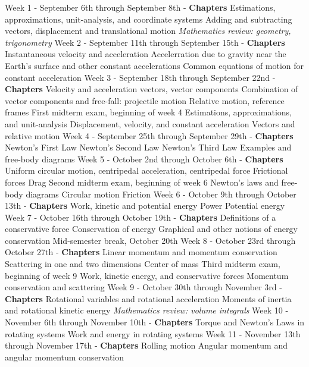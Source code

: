 \documentclass[10pt]{article}
\begin{document}
\begin{outline}[enumerate]
\1 Week 1 - September 6th through September 8th - \textbf{Chapters}
\2 Estimations, approximations, unit-analysis, and coordinate systems
\2 Adding and subtracting vectors, displacement and translational motion
\2 \textit{Mathematics review: geometry, trigonometry}
\1 Week 2 - September 11th through September 15th - \textbf{Chapters}
\2 Instantaneous velocity and acceleration
\2 Accelerration due to gravity near the Earth's surface and other constant accelerations
\2 Common equations of motion for constant acceleration	
\1 Week 3 - September 18th through September 22nd - \textbf{Chapters}
\2 Velocity and acceleration vectors, vector components
\2 Combination of vector components and free-fall: projectile motion
\2 Relative motion, reference frames
\1 First midterm exam, beginning of week 4
\2 Estimations, approximations, and unit-analysis
\2 Displacement, velocity, and constant acceleration
\2 Vectors and relative motion
\1 Week 4 - September 25th through September 29th - \textbf{Chapters}
\2 Newton's First Law
\2 Newton's Second Law
\2 Newton's Third Law
\2 Examples and free-body diagrams
\1 Week 5 - October 2nd through October 6th - \textbf{Chapters}
\2 Uniform circular motion, centripedal acceleration, centripedal force
\2 Frictional forces
\2 Drag
\clearpage
\1 Second midterm exam, beginning of week 6
\2 Newton's laws and free-body diagrams
\2 Circular motion
\2 Friction
\1 Week 6 - October 9th through October 13th - \textbf{Chapters}
\2 Work, kinetic and potential energy
\2 Power
\2 Potential energy
\1 Week 7 - October 16th through October 19th - \textbf{Chapters}
\2 Definitions of a conservative force
\2 Conservation of energy
\3 Graphical and other notions of energy conservation
\1 Mid-semester break, October 20th
\1 Week 8 - October 23rd through October 27th - \textbf{Chapters}
\2 Linear momentum and momentum conservation
\2 Scattering in one and two dimensions
\2 Center of mass
\1 Third midterm exam, beginning of week 9
\2 Work, kinetic energy, and conservative forces
\2 Momentum conservation and scattering
\1 Week 9 - October 30th through November 3rd - \textbf{Chapters}
\2 Rotational variables and rotational acceleration
\2 Moments of inertia and rotational kinetic energy
\3 \textit{Mathematics review: volume integrals}
\1 Week 10 - November 6th through November 10th - \textbf{Chapters}
\2 Torque and Newton's Laws in rotating systems
\2 Work and energy in rotating systems
\1 Week 11 - November 13th through November 17th - \textbf{Chapters}
\2 Rolling motion
\2 Angular momentum and angular momentum conservation

\end{outline}
\end{document}
